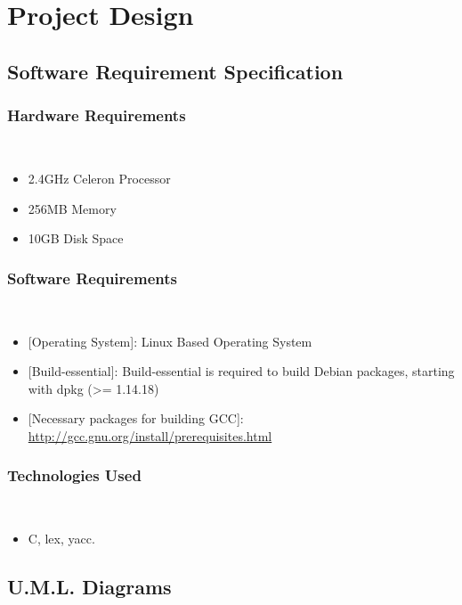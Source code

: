 \chapter{Project Design}

\section{Software Requirement Specification}

\subsection{Hardware Requirements}
\\
\begin{itemize}
\item {2.4GHz Celeron Processor}
\item {256MB Memory}
\item {10GB Disk Space}
\end{itemize}

\subsection{Software Requirements}
\\
\begin{itemize}
\item {[Operating System]: Linux Based Operating System}
\item {[Build-essential]: Build-essential is required to build Debian packages, starting with dpkg (\textgreater= 1.14.18)}
\item {[Necessary packages for building GCC]:\\ \url{http://gcc.gnu.org/install/prerequisites.html}}
\end{itemize}

\subsection{Technologies Used}
\\
\begin{itemize}
\item C, lex, yacc.
\end{itemize}
\newpage
\section{U.M.L. Diagrams}
